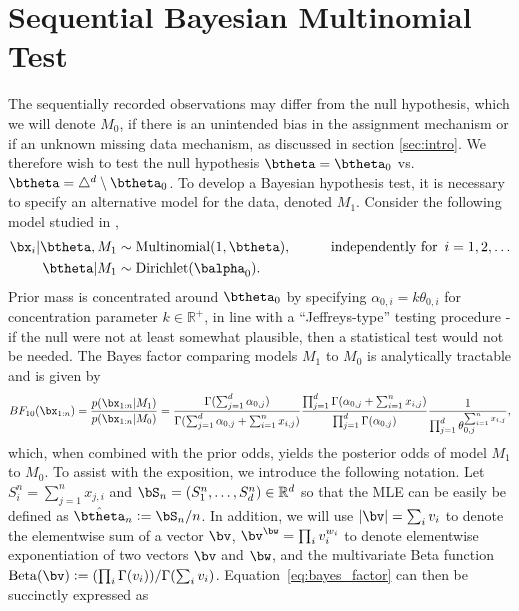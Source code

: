 \documentclass[11pt]{article}
\newcommand{\Reals}{\mathbb R}
\newcommand{\Beta}{\mathrm{Beta}}
\newcommand{\df}{\vcentcolon=}
\begin{document}
\section{Sequential Bayesian Multinomial Test}
\label{sec:srm_testing}
The sequentially recorded observations may differ from the null hypothesis, which we will denote $M_0$, if there is an unintended bias in the assignment mechanism or if an unknown missing data mechanism, as discussed in section \ref{sec:intro}.
We therefore wish to test the null hypothesis $\btheta = \btheta_0$ vs.\ $\btheta = \triangle^d \setminus \btheta_0$.
To develop a Bayesian hypothesis test, it is necessary to specify an alternative model for the data, denoted $M_1$.
Consider the following model studied in \cite{good},
\begin{align}
    \bx_i | \btheta, M_1 &\sim \text{Multinomial}(1,\btheta), \hspace{1cm} \text{independently for }\, i=1,2,\dots\\
  \btheta | M_1 &\sim \text{Dirichlet}(\balpha_0).\notag
\end{align}
Prior mass is concentrated around $\btheta_0$ by specifying $\alpha_{0,i} = k \theta_{0,i}$ for concentration parameter $k \in \mathbb{R}^+$, in line with a ``Jeffreys-type'' testing procedure - if the null were not at least somewhat plausible, then a statistical test would not be needed.
The Bayes factor comparing models $M_1$ to $M_0$ is analytically tractable and is given by
\begin{equation}
  \label{eq:bayes_factor}
 BF_{10}(\bx_{1:n}) = \frac{p(\bx_{1:n}|M_1)}{p(\bx_{1:n}|M_0)} = \frac{\Gamma(\sum_{j=1}^{d} \alpha_{0,j})}{\Gamma(\sum_{j=1}^{d} \alpha_{0,j} + \sum_{i=1}^{n}x_{i,j})}\frac{\prod_{j=1}^{d}\Gamma(\alpha_{0,j} + \sum_{i=1}^{n}x_{i,j} )}{\prod_{j=1}^{d}\Gamma(\alpha_{0,j} )}\frac{1}{\prod_{j=1}^{d} \theta_{0,j}^{\sum_{i=1}^{n}x_{i,j}}},
\end{equation}
which, when combined with the prior odds, yields the posterior odds of model $M_1$ to $M_0$.
To assist with the exposition, we introduce the following notation. 
Let $S_i^n=\sum_{j=1}^{n}x_{j,i}$ and $\bS_n=(S_1^n,\ldots, S_d^n)\in\Reals^d$
so that the MLE can be easily be defined as $\hat \btheta_n \df \bS_n/n$.
In addition, we will use $|\bv| = \sum_{i} v_i$ to denote the elementwise sum of a vector $\bv$, 
$\bv^{\bw} = \prod_{i} v_{i}^{w_i}$ to denote elementwise exponentiation of two vectors $\bv$ and $\bw$,
and the multivariate Beta function $\Beta(\bv) \df (\prod_{i}\Gamma(v_i))/\Gamma(\sum_i v_i)$. 
Equation~\ref{eq:bayes_factor} can then be succinctly expressed as 
\end{document}
